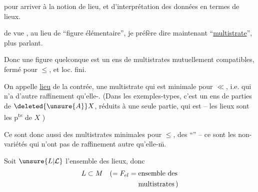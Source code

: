 pour arriver à la notion de lieu, et d'interprétation des données en termes de lieux.

 de vue , au lieu de ``figure élémentaire'', je préfère dire maintenant ``\uline{multistrate}'', plus parlant.

Donc une figure quelconque est un ens de multistrates mutuellement compatibles, fermé pour $\leq$, et loc. fini.

 On appelle  \uline{lieu} de la contrée, une multistrate qui est minimale pour $\ll$, i.e. qui n'a d'autre raffinement qu'elle-.     (Dans les exemples-types, c'est un ens de parties de $\deleted{\unsure{A}}X$, réduits à une seule partie, qui est  --  les lieux sont les p\textsuperscript{ts} de $X$ )

Ce sont donc aussi des multistrates minimales pour $\leq$,   des ``''  -- ce sont les non-variétés  qui n'ont pas de raffinement autre qu'elle-\={m}.

Soit $\unsure{L|\mathcal{L}}$ l'ensemble des lieux,  donc
\[
\begin{aligned}
L\subset M\quad (={}&F_{el}=\text{ensemble des}\\
&\hphantom{F_{el}={}}\text{multistrates}\,)
\end{aligned}
\]
